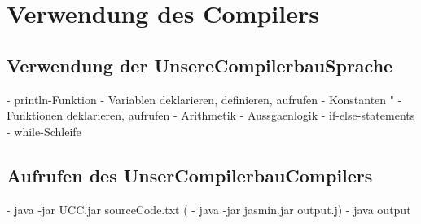 
\section{Verwendung des Compilers}
\subsection{Verwendung der UnsereCompilerbauSprache}
	- println-Funktion
	- Variablen deklarieren, definieren, aufrufen
	- Konstanten "
	- Funktionen deklarieren, aufrufen
	- Arithmetik
	- Aussgaenlogik
	- if-else-statements
	- while-Schleife
\subsection{Aufrufen des UnserCompilerbauCompilers}
	- java -jar UCC.jar sourceCode.txt
  (	- java -jar jasmin.jar output.j)
  	- java output
